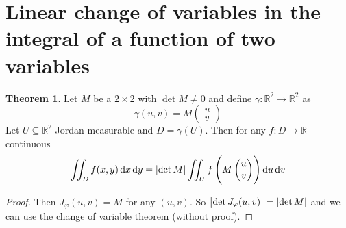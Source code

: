 \documentclass[12pt]{extarticle}
\newcommand{\R}{\mathbb{R}}
\theoremstyle{definition}
\newtheorem{theorem}{Theorem}
\theoremstyle{remark}
\numberwithin{equation}{section}
\begin{document}
\section{Linear change of variables in the integral of a function of two variables}

\begin{theorem}
    Let $M$ be a $2\times 2$ with $\det M \neq 0$ and define $\gamma : \R^2 \to \R^2$ as
    \begin{equation}
        \gamma(u, v) = M \begin{pmatrix}
            u \\ v
        \end{pmatrix}
    \end{equation}
    Let $U \subseteq \R^2$ Jordan measurable and $D = \gamma(U)$.
    Then for any $f: D \to \R$ continuous
    \begin{equation}
        \iint_D f(x, y) \dd{x}\dd{y} = \abs{\det M} \iint_U f\left(M\begin{pmatrix} u \\ v\end{pmatrix}\right) \dd{u} \dd{v}
    \end{equation}
\end{theorem}

\begin{proof}
    Then $J_\varphi(u, v) = M$ for any $(u, v)$.
    So $\abs{\det J_\varphi (u, v)} = \abs{\det M}$ and we can use the change of variable theorem (without proof).
\end{proof}
\end{document}
